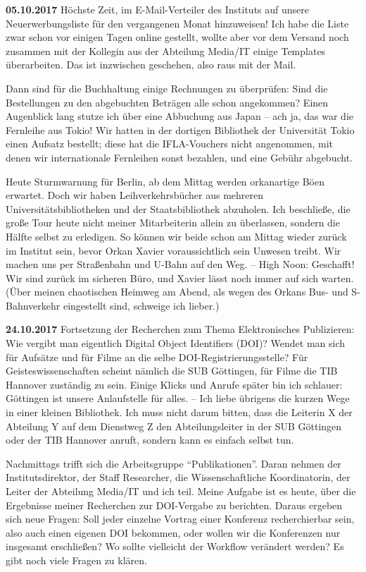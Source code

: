 \documentclass[a4paper,
fontsize=11pt,
oneside,
numbers=noperiodatend,
parskip=half-,
bibliography=totoc,
final
]{scrartcl}
\begin{document}
\textbf{05.10.2017} Höchste Zeit, im E-Mail-Verteiler des Instituts auf
unsere Neuerwerbungsliste für den vergangenen Monat hinzuweisen! Ich
habe die Liste zwar schon vor einigen Tagen online gestellt, wollte aber
vor dem Versand noch zusammen mit der Kollegin aus der Abteilung
Media/IT einige Templates überarbeiten. Das ist inzwischen geschehen,
also raus mit der Mail.

Dann sind für die Buchhaltung einige Rechnungen zu überprüfen: Sind die
Bestellungen zu den abgebuchten Beträgen alle schon angekommen? Einen
Augenblick lang stutze ich über eine Abbuchung aus Japan -- ach ja, das
war die Fernleihe aus Tokio! Wir hatten in der dortigen Bibliothek der
Universität Tokio einen Aufsatz bestellt; diese hat die IFLA-Vouchers
nicht angenommen, mit denen wir internationale Fernleihen sonst
bezahlen, und eine Gebühr abgebucht.

Heute Sturmwarnung für Berlin, ab dem Mittag werden orkanartige Böen
erwartet. Doch wir haben Leihverkehrsbücher aus mehreren
Universitätsbibliotheken und der Staatsbibliothek abzuholen. Ich
beschließe, die große Tour heute nicht meiner Mitarbeiterin allein zu
überlassen, sondern die Hälfte selbst zu erledigen. So können wir beide
schon am Mittag wieder zurück im Institut sein, bevor Orkan Xavier
voraussichtlich sein Unwesen treibt. Wir machen uns per Straßenbahn und
U-Bahn auf den Weg. -- High Noon: Geschafft! Wir sind zurück im sicheren
Büro, und Xavier lässt noch immer auf sich warten. (Über meinen
chaotischen Heimweg am Abend, als wegen des Orkans Bus- und
S-Bahnverkehr eingestellt sind, schweige ich lieber.)

\textbf{24.10.2017} Fortsetzung der Recherchen zum Thema Elektronisches
Publizieren: Wie vergibt man eigentlich Digital Object Identifiers
(DOI)? Wendet man sich für Aufsätze und für Filme an die selbe
DOI-Registrierungsstelle? Für Geisteswissenschaften scheint nämlich die
SUB Göttingen, für Filme die TIB Hannover zuständig zu sein. Einige
Klicks und Anrufe später bin ich schlauer: Göttingen ist unsere
Anlaufstelle für alles. -- Ich liebe übrigens die kurzen Wege in einer
kleinen Bibliothek. Ich muss nicht darum bitten, dass die Leiterin X der
Abteilung Y auf dem Dienstweg Z den Abteilungsleiter in der SUB
Göttingen oder der TIB Hannover anruft, sondern kann es einfach selbst
tun.

Nachmittags trifft sich die Arbeitsgruppe \enquote{Publikationen}. Daran
nehmen der Institutsdirektor, der Staff Researcher, die
Wissenschaftliche Koordinatorin, der Leiter der Abteilung Media/IT und
ich teil. Meine Aufgabe ist es heute, über die Ergebnisse meiner
Recherchen zur DOI-Vergabe zu berichten. Daraus ergeben sich neue
Fragen: Soll jeder einzelne Vortrag einer Konferenz recherchierbar sein,
also auch einen eigenen DOI bekommen, oder wollen wir die Konferenzen
nur insgesamt erschließen? Wo sollte vielleicht der Workflow verändert
werden? Es gibt noch viele Fragen zu klären.
\end{document}

